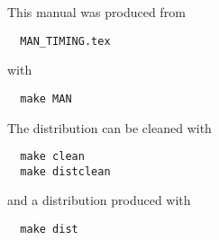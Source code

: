 \documentclass[10pt]{article}
\begin{document}
This manual was produced from
\begin{verbatim}
  MAN_TIMING.tex
\end{verbatim}
with
\begin{verbatim}
  make MAN
\end{verbatim}
The distribution can be cleaned with
\begin{verbatim}
  make clean
  make distclean
\end{verbatim}
and a distribution produced with
\begin{verbatim}
  make dist
\end{verbatim}
\end{document}
